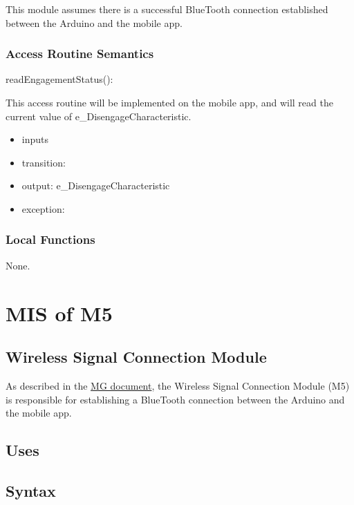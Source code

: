 \documentclass[12pt, titlepage]{article}
\begin{document}

This module assumes there is a successful BlueTooth connection established between the Arduino and the mobile app. 

\subsubsection{Access Routine Semantics}


\noindent readEngagementStatus():

This access routine will be implemented on the mobile app, and will read the current value of  e\_DisengageCharacteristic.

\begin{itemize}
\item inputs
\item transition: %
\item output: e\_DisengageCharacteristic
\item exception:  
\end{itemize}

\subsubsection{Local Functions}

None.


\section{MIS of M5 \label{WirelessSignalConnection}} 

\subsection{Wireless Signal Connection Module}

As described in the \href{https://github.com/NevoAbigail/Capstone/blob/main/docs/Design/SoftArchitecture/MG.pdf}{MG document}, the Wireless Signal Connection Module (M5) is responsible for establishing a BlueTooth connection between the Arduino and the mobile app.

\subsection{Uses}


\subsection{Syntax}
\end{document}
